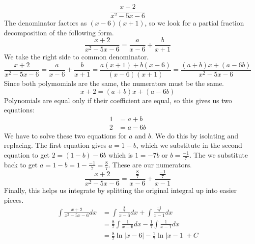 \documentclass[fleqn]{report}
\begin{document}
\begin{example}
\begin{equation*}
\frac{x+2}{x^2- 5x - 6}
\end{equation*}
The denominator factors as $(x-6)(x+1)$, so we look for a
partial fraction decomposition of the following form.
\begin{equation*}
\frac{x+2}{x^2- 5x - 6} = \frac{a}{x-6} + \frac{b}{x+1}
\end{equation*}
We take the right side to common denominator.
\begin{equation*}
\frac{x+2}{x^2- 5x - 6} = \frac{a}{x-6} + \frac{b}{x+1} =
\frac{a(x+1) + b(x-6)}{(x-6)(x+1)} = \frac{(a+b)x +
(a-6b)}{x^2 - 5x -6}
\end{equation*}
Since both polymomials are the same, the numerators must be
the same. 
\begin{equation*}
x+2 = (a+b)x + (a-6b)
\end{equation*}
Polynomials are equal only if their coefficient are equal, so
this gives us two equations:
\begin{align*}
1 & = a+b \\
2 & = a-6b
\end{align*}
We have to solve these two equations for $a$ and $b$. We do
this by isolating and replacing. The first equation gives $a
= 1-b$, which we substitute in the second equation to get $2 =
(1-b) -6b$ which is $1 = -7b$ or $b = \frac{-1}{7}$. The we
substitute back to get $a = 1-b = 1 - \frac{-1}{7} =
\frac{8}{7}$. These are our numerators.
\begin{equation*}
\frac{x+2}{x^2- 5x - 6} = \frac{\frac{8}{7}}{x-6} +
\frac{\frac{-1}{7}}{x-1}
\end{equation*}
Finally, this helps us integrate by splitting the original
integral up into easier pieces.
\begin{align*}
\int \frac{x+2}{x^2- 5x - 6} dx & = \int
\frac{\frac{8}{7}}{x-6} dx +
\int \frac{\frac{-1}{7}}{x-1} dx \\
& = \frac{8}{7} \int \frac{1}{x-6} dx - \frac{1}{7} \int
\frac{1}{x-1} dx \\
& = \frac{8}{7} \ln |x-6| - \frac{1}{7} \ln |x-1| + C
\end{align*}
\end{example}
\end{document}
